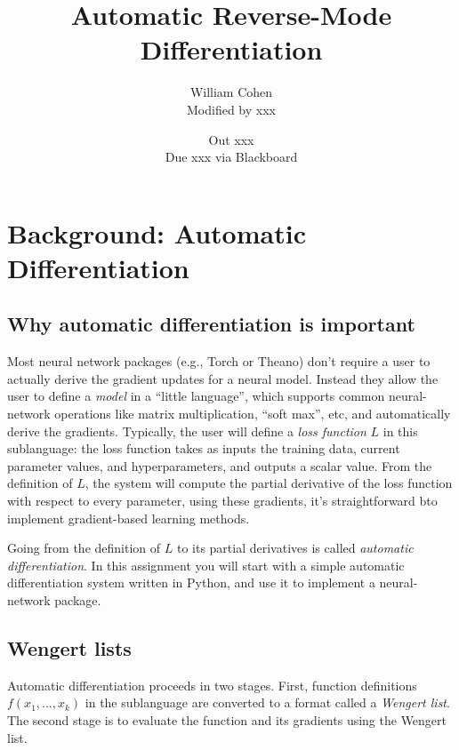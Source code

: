 \documentclass[12pt]{article}
\title{Automatic Reverse-Mode Differentiation}
\author{William Cohen\\ Modified by xxx}
\date{Out xxx\\Due xxx via Blackboard}
\newcommand{\trm}[1]{\textit{#1}}
\newcommand{\loss}{\textit{L}}
\begin{document}
\maketitle

\section{Background: Automatic Differentiation}

\subsection{Why automatic differentiation is important}

Most neural network packages (e.g., Torch or Theano) don't require a
user to actually derive the gradient updates for a neural model.
Instead they allow the user to define a \trm{model} in a ``little
language'', which supports common neural-network operations like
matrix multiplication, ``soft max'', etc, and automatically derive the
gradients.  Typically, the user will define a \trm{loss function}
$\loss$ in this sublanguage: the loss function takes as inputs the
training data, current parameter values, and hyperparameters, and
outputs a scalar value. From the definition of $\loss$, the system
will compute the partial derivative of the loss function with respect
to every parameter, using these gradients, it's straightforward bto
implement gradient-based learning methods.

Going from the definition of $\loss$ to its partial derivatives is
called \trm{automatic differentiation}.  In this assignment you will
start with a simple automatic differentiation system written in
Python, and use it to implement a neural-network package.

\subsection{Wengert lists}

Automatic differentiation proceeds in two stages.  First, function
definitions $f(x_1,\ldots,x_k)$ in the sublanguage are converted to a
format called a \trm{Wengert list}.  The second stage is to evaluate
the function and its gradients using the Wengert list.
\end{document}
